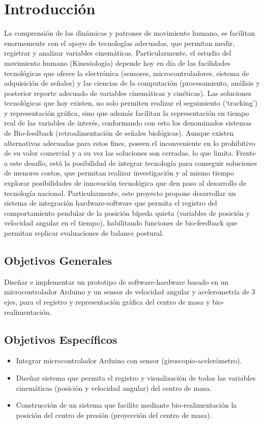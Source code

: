\documentclass[12pt,a4paper]{article}
\begin{document}
\tableofcontents %
\thispagestyle{empty}
\pagebreak


\section{Introducción}

La comprensión de las dinámicas y patrones de movimiento humano, se facilitan enormemente con el apoyo de tecnologías adecuadas, que permitan medir, registrar y analizar variables cinemáticas. Particularmente, el estudio del movimiento humano (Kinesiología) depende hoy en día de las facilidades tecnológicas que ofrece la electrónica (sensores, microcontroladores, sistema de adquisición de señales) y las ciencias de la computación (procesamiento, análisis y posterior reporte adecuado de  variables cinemáticas y cinéticas).  
Las soluciones tecnológicas que hoy existen, no solo permiten realizar el seguimiento (‘tracking’) y representación gráfica, sino que además facilitan la representación en tiempo real de las variables de interés, conformando con esto los denominados sistemas de Bio-feedback (retroalimentación de señales biológicas). Aunque existen alternativas adecuadas para estos fines, poseen el inconveniente en lo prohibitivo de su valor comercial {\color{red} y a su vez las soluciones son cerradas, lo que limita}.
Frente a este desafío, está la posibilidad de integrar tecnología para conseguir soluciones de menores costos, que permitan realizar investigación y al mismo tiempo explorar posibilidades de innovación tecnológica que den paso al desarrollo de tecnología nacional.
Particularmente, este proyecto propone desarrollar un sistema de integración hardware-software que permita el registro del comportamiento pendular de la posición bípeda quieta (variables de posición y velocidad angular en el tiempo), habilitando funciones de bio-feedback que permitan replicar evaluaciones de balance postural.

\subsection{Objetivos Generales}
Diseñar e implementar un prototipo de software-hardware basado en un microcontrolador Arduino y un sensor de velocidad angular y acelerometría de 3 ejes, para el registro y representación gráfica del centro de masa y bio-realimentación.

\subsection{Objetivos Específicos}
\begin{itemize}
\item Integrar microcontrolador Arduino con sensor (giroscopio-acelerómetro).
\item Diseñar sistema que permita el registro y visualización de todas las variables cinemáticas (posición y velocidad angular) del centro de masa. 
\item Construcción de un sistema que facilite mediante bio-realimentación la posición del centro de presión (proyección del centro de masa).
\end{itemize}	
\end{document}
